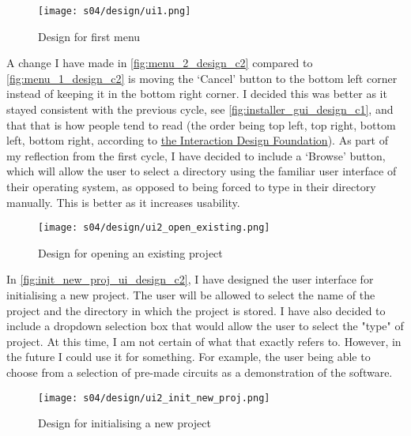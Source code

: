         \begin{figure}[!ht]
            \centering
            \texttt{[image: s04/design/ui1.png]}
            \caption{Design for first menu}
            \label{fig:menu_1_design_c2}
        \end{figure}

        A change I have made in \autoref{fig:menu_2_design_c2} compared to \autoref{fig:menu_1_design_c2} is moving the `Cancel' button to the bottom left corner instead of keeping it in the bottom right corner. I decided this was better as it stayed consistent with the previous cycle, see \autoref{fig:installer_gui_design_c1}, and that that is how people tend to read (the order being top left, top right, bottom left, bottom right, according to \href{https://www.interaction-design.org/literature/article/visual-hierarchy-organizing-content-to-follow-natural-eye-movement-patterns}{the Interaction Design Foundation}). As part of my reflection from the first cycle, I have decided to include a `Browse' button, which will allow the user to select a directory using the familiar user interface of their operating system, as opposed to being forced to type in their directory manually. This is better as it increases usability. 

        \begin{figure}[!ht]
            \centering
            \texttt{[image: s04/design/ui2\_open\_existing.png]}
            \caption{Design for opening an existing project}
            \label{fig:menu_2_design_c2}
        \end{figure}

        In \autoref{fig:init_new_proj_ui_design_c2}, I have designed the user interface for initialising a new project. The user will be allowed to select the name of the project and the directory in which the project is stored. I have also decided to include a dropdown selection box that would allow the user to select the "type" of project. At this time, I am not certain of what that exactly refers to. However, in the future I could use it for something. For example, the user being able to choose from a selection of pre-made circuits as a demonstration of the software.

        \begin{figure}[!ht]
            \centering
            \texttt{[image: s04/design/ui2\_init\_new\_proj.png]}
            \caption{Design for initialising a new project}
            \label{fig:init_new_proj_ui_design_c2}
        \end{figure}

